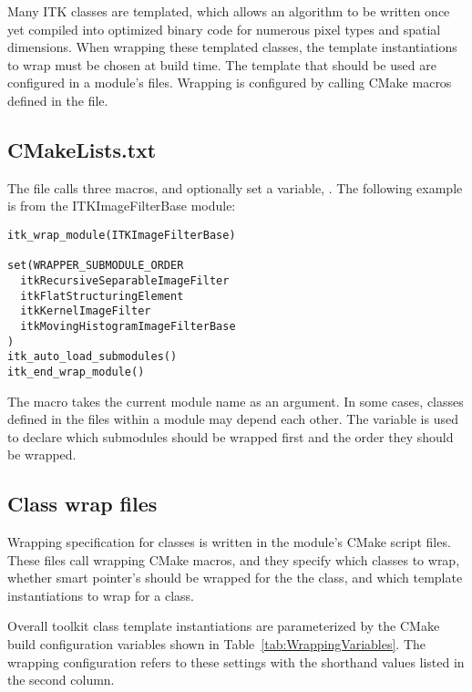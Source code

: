 Many ITK classes are templated, which allows an algorithm to be written once
yet compiled into optimized binary code for numerous pixel types and
spatial dimensions. When wrapping these templated classes, the template
instantiations to wrap must be chosen at build time. The template
that should be used are configured in a module's  files.
Wrapping is configured by calling CMake macros defined in the
 file.


\subsection{CMakeLists.txt}

The  file calls three macros, and
optionally set a variable, . The following
example is from the ITKImageFilterBase module:

\begin{verbatim}
itk_wrap_module(ITKImageFilterBase)

set(WRAPPER_SUBMODULE_ORDER
  itkRecursiveSeparableImageFilter
  itkFlatStructuringElement
  itkKernelImageFilter
  itkMovingHistogramImageFilterBase
)
itk_auto_load_submodules()
itk_end_wrap_module()
\end{verbatim}

The  macro takes the current module name as an argument. In
some cases, classes defined in the  files within a module may depend
each other. The  variable is used to declare
which submodules should be wrapped first and the order they should be
wrapped.


\subsection{Class wrap files}

Wrapping specification for classes is written in the module's 
CMake script files. These files call wrapping CMake macros, and they specify
which classes to wrap, whether smart pointer's should be wrapped for the the
class, and which template instantiations to wrap for a class.

Overall toolkit class template instantiations are parameterized by the CMake
build configuration variables shown in Table~\ref{tab:WrappingVariables}.
The wrapping configuration refers to these settings with the shorthand values
listed in the second column.


